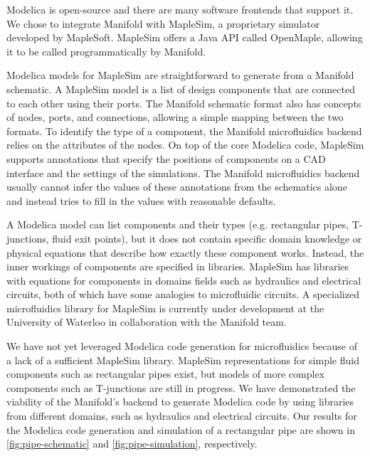 Modelica is open-source and there are many software frontends that support it.
We chose to integrate Manifold with MapleSim, a proprietary simulator developed by MapleSoft.
MapleSim offers a Java API called OpenMaple, allowing it to be called programmatically by Manifold.

Modelica models for MapleSim are straightforward to generate from a Manifold schematic.
A MapleSim model is a list of design components that are connected to each other using their ports.
The Manifold schematic format also has concepts of nodes, ports, and connections, allowing a simple mapping
between the two formats.
To identify the type of a component, the Manifold microfluidics backend relies on the attributes of the nodes.
On top of the core Modelica code, MapleSim supports annotations that specify the positions of components on a CAD interface and the settings of the simulations.
The Manifold microfluidics backend usually cannot infer the values of these annotations from the schematics
alone and instead tries to fill in the values with reasonable defaults.

A Modelica model can list components and their types (e.g. rectangular pipes, T-junctions, fluid exit points),
but it does not contain specific domain knowledge or physical equations that describe how exactly these
component works.
Instead, the inner workings of components are specified in libraries.
MapleSim has libraries with equations for components in domains fields such as hydraulics and electrical
circuits, both of which have some analogies to microfluidic circuits.
A specialized microfluidics library for MapleSim is currently under development at the University of Waterloo
in collaboration with the Manifold team.

We have not yet leveraged Modelica code generation for microfluidics because of a lack of a sufficient
MapleSim library.
MapleSim representations for simple fluid components such as rectangular pipes exist, but models of more complex components such as T-junctions are still in progress.
We have demonstrated the viability of the Manifold's backend to generate Modelica code by using
libraries from different domains, such as hydraulics and electrical circuits. Our results for the Modelica
code generation and simulation of a rectangular pipe are shown in \autoref{fig:pipe-schematic} and
\autoref{fig:pipe-simulation}, respectively.

